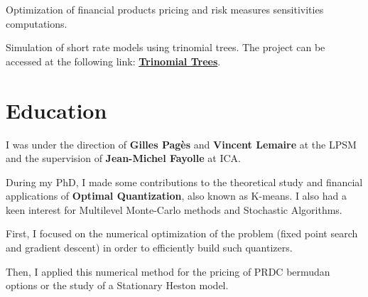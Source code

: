 \documentclass[]{deedy-resume-openfont}
\begin{document}
\sectionsep
\sectionsep

Optimization of financial products pricing and risk measures sensitivities computations.

\sectionsep
\sectionsep

Simulation of short rate models using trinomial trees. The project can be accessed at the following link: \href{http://simulations.lpsm.paris/trinomial_trees/}{\bf Trinomial Trees}.

\sectionsep

\vspace{\topsep}

\section{Education}
\sectionsep

I was under the direction of \textbf{Gilles Pagès} and \textbf{Vincent Lemaire} at the LPSM and the supervision of \textbf{Jean-Michel Fayolle} at ICA.

\vspace{0.2cm}
During my PhD, I made some contributions to the theoretical study and financial applications of \textbf{Optimal Quantization}, also known as K-means. I also had a keen interest for Multilevel Monte-Carlo methods and Stochastic Algorithms.
\vspace{0.1cm}
\begin{tightemize}
	\item[\diamond] First, I focused on the numerical optimization of the problem (fixed point search and gradient descent) in order to efficiently build such quantizers.
	\item[\diamond] Then, I applied this numerical method for the pricing of PRDC bermudan options or the study of a Stationary Heston model.
\end{tightemize}

\sectionsep
\sectionsep
\end{document}
